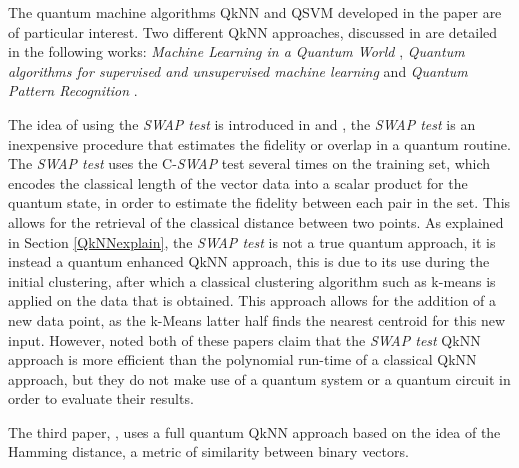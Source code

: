 The quantum machine algorithms QkNN and QSVM developed in the paper are of particular interest. 
Two different QkNN approaches, discussed in \citep{research1} are detailed in the following works: \emph{Machine Learning in a Quantum World} \citep{aimeursubQkNNFid}, \emph{Quantum algorithms for supervised and unsupervised machine learning} \citep{lloydsubQkNNFid} and \emph{Quantum Pattern Recognition} \citep{trugenbergersubQkNNHamm}.

The idea of using the \emph{SWAP test} is introduced in \citeauthor{aimeursubQkNNFid} and \citeauthor{lloydsubQkNNFid}, the \emph{SWAP test} is an inexpensive procedure that estimates the fidelity or overlap in a quantum routine. The \emph{SWAP test} uses the C-\emph{SWAP} test several times on the training set, which encodes the classical length of the vector data into a scalar product for the quantum state, in order to estimate the fidelity between each pair in the set. This allows for the retrieval of the classical distance between two points. As explained in Section \ref{QkNNexplain}, the \emph{SWAP test} is not a true quantum approach, it is instead a quantum enhanced QkNN approach, this is due to its use during the initial clustering, after which a classical clustering algorithm such as k-means is applied on the data that is obtained. This approach allows for the addition of a new data point, as the k-Means latter half finds the nearest centroid for this new input. 
However, \citeauthor{research1} noted both of these papers claim that the \emph{SWAP test} QkNN approach is more efficient than the polynomial run-time of a classical QkNN approach, but they do not make use of a quantum system or a quantum circuit in order to evaluate their results.

The third paper, \citep{trugenbergersubQkNNHamm}, uses a full quantum QkNN approach based on the idea of the Hamming distance,
a metric of similarity between binary vectors.

